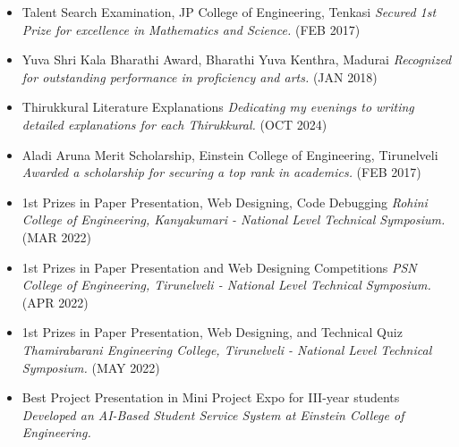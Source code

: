 \documentclass[letterpaper,11pt]{article}
\begin{document}
\begin{itemize}
    \item Talent Search Examination, JP College of Engineering, Tenkasi  
          \textit{Secured 1st Prize for excellence in Mathematics and Science.} (FEB 2017)
    \vspace{-2mm}

    \item Yuva Shri Kala Bharathi Award, Bharathi Yuva Kenthra, Madurai  
          \textit{Recognized for outstanding performance in proficiency and arts.} (JAN 2018)
    \vspace{-2mm}

    \item Thirukkural Literature Explanations  
          \textit{Dedicating my evenings to writing detailed explanations for each Thirukkural.} (OCT 2024)
    \vspace{-2mm}

    \item Aladi Aruna Merit Scholarship, Einstein College of Engineering, Tirunelveli  
          \textit{Awarded a scholarship for securing a top rank in academics.} (FEB 2017)
    \vspace{-2mm}

    \item 1st Prizes in Paper Presentation, Web Designing, Code Debugging  
          \textit{Rohini College of Engineering, Kanyakumari - National Level Technical Symposium.} (MAR 2022)
    \vspace{-2mm}

    \item 1st Prizes in Paper Presentation and Web Designing Competitions  
          \textit{PSN College of Engineering, Tirunelveli - National Level Technical Symposium.} (APR 2022)
    \vspace{-2mm}

    \item 1st Prizes in Paper Presentation, Web Designing, and Technical Quiz  
          \textit{Thamirabarani Engineering College, Tirunelveli - National Level Technical Symposium.} (MAY 2022)
    \vspace{-2mm}

    \item Best Project Presentation in Mini Project Expo for III-year students  
          \textit{Developed an AI-Based Student Service System at Einstein College of Engineering.}
\end{itemize}
\vspace{2cm}
\end{document}
